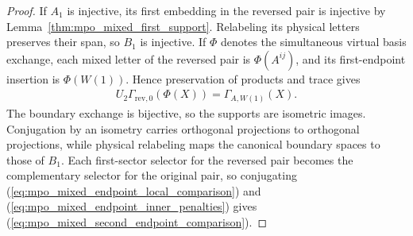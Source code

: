 \begin{proof}
    \leanok
    If $A_1$ is injective, its first embedding in the reversed pair is
    injective by Lemma~\ref{thm:mpo_mixed_first_support}. Relabeling
    its physical letters preserves their span, so $B_1$ is injective.
    If $\Phi$ denotes the simultaneous virtual basis exchange, each
    mixed letter of the reversed pair is $\Phi(A^{ij})$, and its
    first-endpoint insertion is $\Phi(W(1))$. Hence preservation of
    products and trace gives
    \begin{align}
        U_2\Gamma_{\mathrm{rev},0}(\Phi(X))=\Gamma_{A,W(1)}(X).
    \end{align}
    The boundary exchange is bijective, so the supports are isometric
    images. Conjugation by an isometry carries orthogonal projections to
    orthogonal projections, while physical relabeling maps the canonical
    boundary spaces to those of $B_1$.
    Each first-sector selector for the reversed pair becomes the
    complementary selector for the original pair, so conjugating
    (\ref{eq:mpo_mixed_endpoint_local_comparison}) and
    (\ref{eq:mpo_mixed_endpoint_inner_penalties}) gives
    (\ref{eq:mpo_mixed_second_endpoint_comparison}).
\end{proof}

